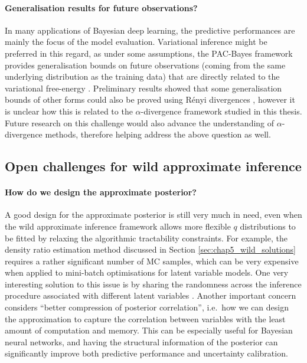 \paragraph{Generalisation results for future observations? \\}
In many applications of Bayesian deep learning, the predictive performances are mainly the focus of the model evaluation. Variational inference might be preferred in this regard, as under some assumptions, the PAC-Bayes framework provides generalisation bounds on future observations (coming from the same underlying distribution as the training data) that are directly related to the variational free-energy \citep{mcallester:pac1998, germain:pac2016}. Preliminary results showed that some generalisation bounds of other forms could also be proved using R{\'e}nyi divergences \citep{begin:pac2016}, however it is unclear how this is related to the $\alpha$-divergence framework studied in this thesis. Future research on this challenge would also advance the understanding of $\alpha$-divergence methods, therefore helping address the above question as well.


\subsection{Open challenges for wild approximate inference}
\paragraph{How do we design the approximate posterior? \\}
A good design for the approximate posterior is still very much in need, even when the wild approximate inference framework allows more flexible $q$ distributions to be fitted by relaxing the algorithmic tractability constraints. For example, the density ratio estimation method discussed in Section \ref{sec:chap5_wild_solutions} requires a rather significant number of MC samples, which can be very expensive when applied to mini-batch optimisations for latent variable models. One very interesting solution to this issue is by sharing the randomness across the inference procedure associated with different latent variables \citep{mescheder:avb2017}. Another important concern considers ``better compression of posterior correlation'', i.e.~how we can design the approximation to capture the correlation between variables with the least amount of computation and memory. This can be especially useful for Bayesian neural networks, and having the structural information of the posterior can significantly improve both predictive performance and uncertainty calibration. 

